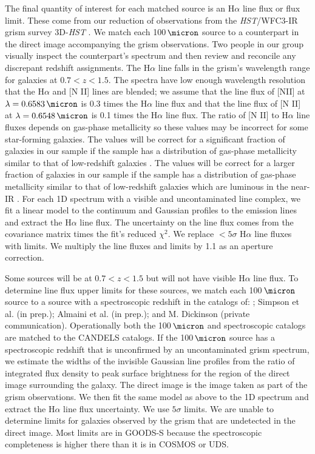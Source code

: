 \documentclass[preprint]{aastex}
\begin{document}
The final quantity of interest for each matched source is an H$\alpha$ line
flux or flux limit.  These come from our reduction of observations from the
\emph{HST}/WFC3-IR grism survey 3D-\emph{HST} \citep{brammer12}.
We match each 100$\,\micron$ source to a counterpart in the direct image
accompanying the grism observations.  Two people in our group visually inspect
the counterpart's spectrum and then review and reconcile any discrepant redshift
assignments.  The
H$\alpha$ line falls in the grism's wavelength range for galaxies at
$0.7 < z < 1.5$.  The spectra have low enough wavelength resolution that the
H$\alpha$ and [N II] lines are blended; we assume that the line flux of [NII]
at $\lambda = 0.6583\,\micron$ is 0.3 times the H$\alpha$ line flux and that
the line flux of [N II] at $\lambda = 0.6548\,\micron$ is 0.1 times the
H$\alpha$ line flux.  The ratio of [N II] to H$\alpha$ line fluxes depends on
gas-phase metallicity so these values may be incorrect for some star-forming
galaxies.
The values will be correct for a significant fraction of galaxies in our
sample if the sample has a distribution of
gas-phase metallicity similar to that of low-redshift galaxies
\citep{kauffmann03}.  The values will be correct for a larger fraction of
galaxies in our sample if the sample has a distribution of gas-phase
metallicity similar to that of low-redshift galaxies which are luminous in
the near-IR \citep{weiner07}.  For each 1D spectrum with a visible and
uncontaminated
line complex, we fit a linear model to the continuum and Gaussian profiles to
the emission lines and extract the H$\alpha$ line flux.  The uncertainty on the
line flux comes from the covariance matrix times the fit's reduced $\chi^{2}$.
We replace $< 5\sigma$ H$\alpha$ line fluxes with limits.  We multiply the line
fluxes and limits by 1.1 as an aperture correction.

Some sources will be at $0.7 < z < 1.5$ but will not have visible H$\alpha$
line flux.  To determine line flux upper limits for these sources, we match each
100$\,\micron$ source to a source with a spectroscopic redshift in
the catalogs of: \citet{lefevre04,szokoly04,mignoli05,yamada05,ravikumar07,
vanzella08,lilly09,balestra10,fadda10,simpson12,kurk13,santini14}; Simpson et
al. (in prep.); Almaini et al. (in prep.); and
M. Dickinson (private communication).  Operationally both the
100$\,\micron$ and spectroscopic catalogs are matched to the CANDELS catalogs.
If the 100$\,\micron$ source has a spectroscopic redshift that is unconfirmed
by an uncontaminated grism spectrum, we estimate the widths of the invisible
Gaussian line profiles from the ratio of integrated flux density to peak
surface brightness for the region of the direct image surrounding the galaxy.
The direct
image is the image taken as part of the grism observations.  We then fit
the same model as above to the 1D spectrum and extract the H$\alpha$ line flux
uncertainty.  We use $5\sigma$ limits.  We are unable to determine limits for
galaxies observed by the grism that are undetected in the direct image.  Most
limits are in GOODS-S because the spectroscopic completeness is higher there
than it is in COSMOS or UDS.
\end{document}

